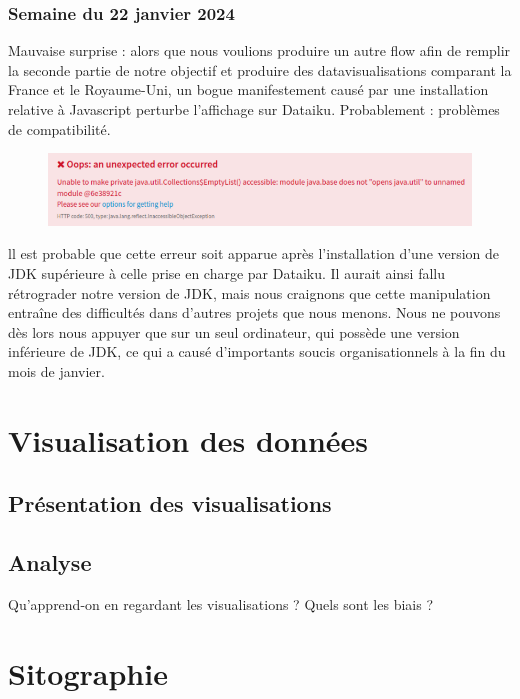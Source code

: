 \documentclass[hidelinks, 12pt]{article}
\begin{document}
\subsubsection{Semaine du 22 janvier 2024}

Mauvaise surprise : alors que nous voulions produire un autre flow afin de remplir la seconde partie de notre objectif et produire des datavisualisations comparant la France et le Royaume-Uni, un bogue manifestement causé par une installation relative à Javascript perturbe l'affichage sur Dataiku. Probablement : problèmes de compatibilité.

\begin{center}
	\begin{figure}[H]
		\includegraphics[scale=0.5]{bogue.png}
	\end{figure}
\end{center}

ll est probable que cette erreur soit apparue après l’installation d’une version de JDK supérieure à celle prise en charge par Dataiku. Il aurait ainsi fallu rétrograder notre version de JDK, mais nous craignons que cette manipulation entraîne des difficultés dans d’autres projets que nous menons. Nous ne pouvons dès lors nous appuyer que sur un seul ordinateur, qui possède une version inférieure de JDK, ce qui a causé d’importants soucis organisationnels à la fin du mois de janvier.


\section{Visualisation des données}

\subsection{Présentation des visualisations}

\subsection{Analyse}

Qu'apprend-on en regardant les visualisations ? Quels sont les biais ?
\newpage


\section{Sitographie}
\printbibliography[heading=none]
\newpage

\tableofcontents
\end{document}
